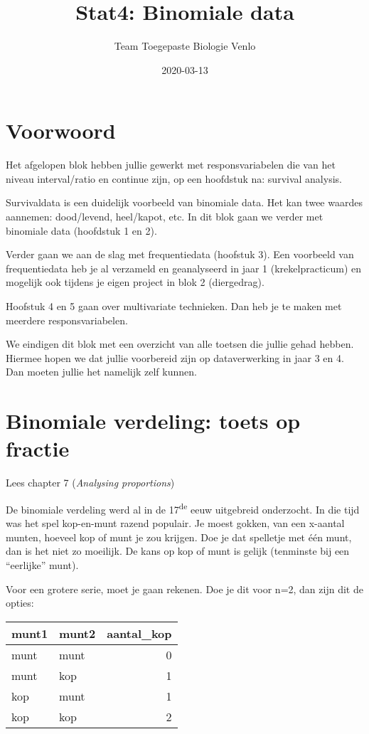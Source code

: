 \documentclass[]{book}
\title{Stat4: Binomiale data}
\author{Team Toegepaste Biologie Venlo}
\date{2020-03-13}
\theoremstyle{definition}
\theoremstyle{definition}
\theoremstyle{definition}
\theoremstyle{remark}
\let\BeginKnitrBlock\begin \let\EndKnitrBlock\end
\begin{document}
\maketitle

{
\setcounter{tocdepth}{1}
\tableofcontents
}
\chapter*{Voorwoord}\label{voorwoord}

Het afgelopen blok hebben jullie gewerkt met responsvariabelen die van
het niveau interval/ratio en continue zijn, op een hoofdstuk na:
survival analysis.

Survivaldata is een duidelijk voorbeeld van binomiale data. Het kan twee
waardes aannemen: dood/levend, heel/kapot, etc. In dit blok gaan we
verder met binomiale data (hoofdstuk 1 en 2).

Verder gaan we aan de slag met frequentiedata (hoofstuk 3). Een
voorbeeld van frequentiedata heb je al verzameld en geanalyseerd in jaar
1 (krekelpracticum) en mogelijk ook tijdens je eigen project in blok 2
(diergedrag).

Hoofstuk 4 en 5 gaan over multivariate technieken. Dan heb je te maken
met meerdere responsvariabelen.

We eindigen dit blok met een overzicht van alle toetsen die jullie gehad
hebben. Hiermee hopen we dat jullie voorbereid zijn op dataverwerking in
jaar 3 en 4. Dan moeten jullie het namelijk zelf kunnen.

\chapter{Binomiale verdeling: toets op
fractie}\label{binomiale-verdeling-toets-op-fractie}

\BeginKnitrBlock{ABD}
Lees chapter 7 (\emph{Analysing proportions})
\EndKnitrBlock{ABD}

De binomiale verdeling werd al in de 17\textsuperscript{de} eeuw
uitgebreid onderzocht. In die tijd was het spel kop-en-munt razend
populair. Je moest gokken, van een x-aantal munten, hoeveel kop of munt
je zou krijgen. Doe je dat spelletje met één munt, dan is het niet zo
moeilijk. De kans op kop of munt is gelijk (tenminste bij een
``eerlijke'' munt).

Voor een grotere serie, moet je gaan rekenen. Doe je dit voor n=2, dan
zijn dit de opties:

\begin{tabular}{l|l|r}
\hline
munt1 & munt2 & aantal\_kop\\
\hline
munt & munt & 0\\
\hline
munt & kop & 1\\
\hline
kop & munt & 1\\
\hline
kop & kop & 2\\
\hline
\end{tabular}
\end{document}
